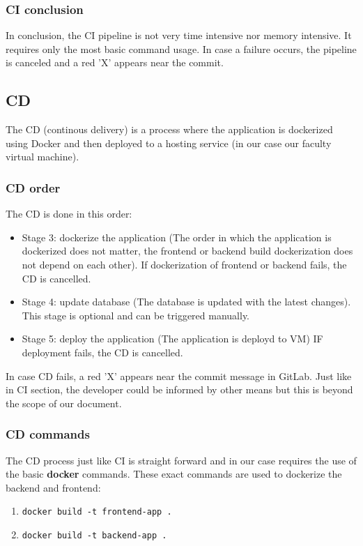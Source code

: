 \documentclass[]{VUMIFTemplateClass}
\begin{document}
\subsubsection{CI conclusion}
In conclusion, the CI pipeline is not very time intensive nor memory intensive. 
It requires only the most basic command usage. 
In case a failure occurs, the pipeline is canceled and a red 'X' appears near the commit.

\subsection{CD}
The CD (continous delivery) is a process where the application is 
dockerized using Docker and then deployed to a hosting service (in our case our faculty virtual machine).

\subsubsection{CD order}
The CD is done in this order:
\begin{itemize}
    \item Stage 3: dockerize the application (The order in which the application is dockerized does not matter, the frontend or backend build dockerization does not depend on each other).
    If dockerization of frontend or backend fails, the CD is cancelled.
    \item Stage 4: update database (The database is updated with the latest changes). This stage is optional and can be triggered manually.
    \item Stage 5: deploy the application (The application is deployd to VM)
    IF deployment fails, the CD is cancelled.
\end{itemize}

In case CD fails, a red 'X' appears near the commit message in GitLab.
Just like in CI section, the developer could be informed by other means but this is beyond the scope of our document.

\subsubsection{CD commands}
The CD process just like CI is straight forward and in our case requires the use
of the basic \textbf{docker} commands. These exact commands are used to dockerize the backend and frontend:
\begin{enumerate}
    \item \texttt{docker build -t frontend-app .}
    \item \texttt{docker build -t backend-app .}
\end{enumerate}
\end{document}
